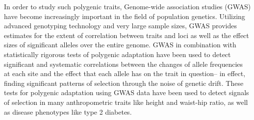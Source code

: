 \documentclass[a4paper,10pt]{article}
\newcommand{\jb}[1]{{\color{blue} (#1)} }
\begin{document}
In order to study such polygenic traits, Genome-wide association studies (GWAS) have become increasingly
important in the field of population genetics. Utilizing advanced
genotyping technology and very large sample sizes, GWAS provides
estimates for the extent of correlation between traits and loci as well as the
effect sizes of significant alleles over the entire genome. GWAS in combination with statistically rigorous tests of
polygenic adaptation have been used to detect significant and
systematic correlations between the changes of allele frequencies at
each site and the effect that each allele has on the trait in
question-- in effect, finding significant patterns of selection
through the noise of genetic drift. These tests for polygenic
adaptation using GWAS data have been used to detect signals of
selection in many anthropometric traits like height
and waist-hip ratio, as well as disease phenotypes like type 2
diabetes\cite{gwasintro,gwasproblems}.

\begin{comment}
 \jb{Hmm, I think this next bit is a bit muddled. First, you talking about ``this method of analysis'',
  but you don't really explain what the method of analysis is. The basic idea behind most tests of polygenic adaptation
  (ours included) is that selection on a quantitative trait should cause subtle but coordinated shifts in allele frequency
  across all of the many sites which contribute to variation in the trait. These shifts are too small to detect individually
  against the background of genetic drift, but if we have an annotation of which alleles contribute to a given trait,
  and which know which allele is the trait increasing allele and which is the trait decreasing allele, then we can ask whether
  it is the case that the allele frequency changes across all of these many loci are systematically correlated with the effect
  that a given allele has on the trait. This sort of pattern is extremely unlikely under genetic drift, and is also what leads
  to divergence among populations in their average phenotypes, so observing it is thought to be pretty good evidence that the
  phenotype we're looking at (or something genetically correlated with it) has been impacted by directional selection.

  Another point worth mentioning is that the potential bias is not so much with GWAS as with how GWAS data are typically
  applied in tests of polygenic adaptation. For example, GWAS does not assume anything about the relationship between
  an allele's additive effect on the trait and the frequency of the allele over time. That is an assumption of polygenic adaptation
  tests. GWAS is just a means for 1) identifying trait associated loci, and 2) estimating the size of their effects.}
\end{comment}
\end{document}
